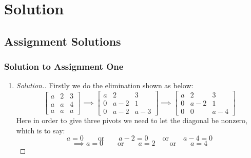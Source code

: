 
\chapter{Solution}

\section{Assignment Solutions}
\subsection{Solution to Assignment One}
\begin{enumerate}
\item 
\begin{proof}[Solution.]
Firstly we do the elimination shown as below:
\[\begin{bmatrix}
a & 2 & 3 \\ a & a & 4 \\ a & a & a
\end{bmatrix}\implies\begin{bmatrix}
a & 2 & 3 \\ 0 & a-2 & 1 \\ 0 & a-2 & a-3
\end{bmatrix}\implies
\begin{bmatrix}
a & 2 & 3 \\ 0 & a-2 & 1 \\ 0 & 0 & a-4
\end{bmatrix}\]
Here in order to give three pivots we need to let the diagonal be nonzero, which is to say:
\[
a = 0 \qquad\text{or}\qquad a-2=0 \qquad\text{or}\qquad a-4 = 0
\] 
\[\implies a = 0 \qquad\text{or}\qquad a=2 \qquad\text{or}\qquad a=4\]
\end{proof}





\end{enumerate}
